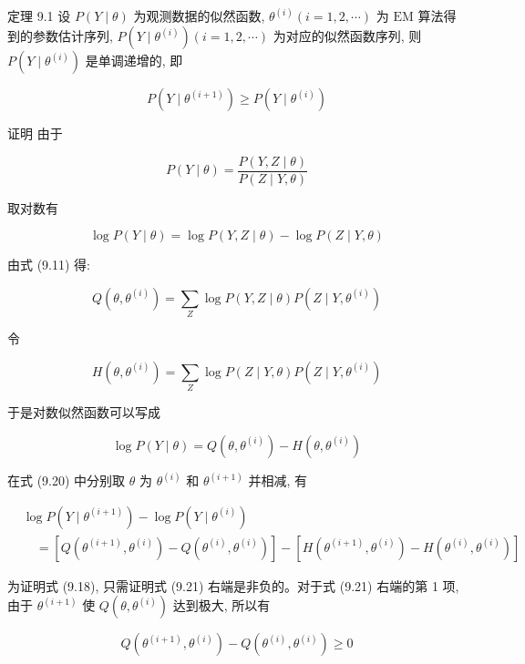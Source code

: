 \documentclass[10pt]{article}
\begin{document}
定理 9.1 设 $P(Y \mid \theta)$ 为观测数据的似然函数, $\theta^{(i)}(i=1,2, \cdots)$ 为 $\mathrm{EM}$ 算法得到的参数估计序列, $P\left(Y \mid \theta^{(i)}\right)(i=1,2, \cdots)$ 为对应的似然函数序列, 则 $P\left(Y \mid \theta^{(i)}\right)$ 是单调递增的, 即


\begin{equation*}
P\left(Y \mid \theta^{(i+1)}\right) \geqslant P\left(Y \mid \theta^{(i)}\right) \tag{9.18}
\end{equation*}


证明 由于

$$
P(Y \mid \theta)=\frac{P(Y, Z \mid \theta)}{P(Z \mid Y, \theta)}
$$

取对数有

$$
\log P(Y \mid \theta)=\log P(Y, Z \mid \theta)-\log P(Z \mid Y, \theta)
$$

由式 (9.11) 得:

$$
Q\left(\theta, \theta^{(i)}\right)=\sum_{Z} \log P(Y, Z \mid \theta) P\left(Z \mid Y, \theta^{(i)}\right)
$$

令


\begin{equation*}
H\left(\theta, \theta^{(i)}\right)=\sum_{Z} \log P(Z \mid Y, \theta) P\left(Z \mid Y, \theta^{(i)}\right) \tag{9.19}
\end{equation*}


于是对数似然函数可以写成


\begin{equation*}
\log P(Y \mid \theta)=Q\left(\theta, \theta^{(i)}\right)-H\left(\theta, \theta^{(i)}\right) \tag{9.20}
\end{equation*}


在式 (9.20) 中分别取 $\theta$ 为 $\theta^{(i)}$ 和 $\theta^{(i+1)}$ 并相减, 有


\begin{align*}
& \log P\left(Y \mid \theta^{(i+1)}\right)-\log P\left(Y \mid \theta^{(i)}\right) \\
& \quad=\left[Q\left(\theta^{(i+1)}, \theta^{(i)}\right)-Q\left(\theta^{(i)}, \theta^{(i)}\right)\right]-\left[H\left(\theta^{(i+1)}, \theta^{(i)}\right)-H\left(\theta^{(i)}, \theta^{(i)}\right)\right] \tag{9.21}
\end{align*}


为证明式 (9.18), 只需证明式 (9.21) 右端是非负的。对于式 (9.21) 右端的第 1 项, 由于 $\theta^{(i+1)}$ 使 $Q\left(\theta, \theta^{(i)}\right)$ 达到极大, 所以有


\begin{equation*}
Q\left(\theta^{(i+1)}, \theta^{(i)}\right)-Q\left(\theta^{(i)}, \theta^{(i)}\right) \geqslant 0 \tag{9.22}
\end{equation*}
\end{document}

